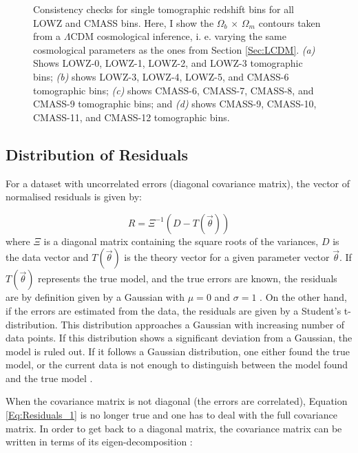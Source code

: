 \begin{figure}
\begin{subfigure}{.5\textwidth}
  \caption{}
\end{subfigure}%
\caption[Consistency checks for single tomographic redshift bins for all LOWZ and CMASS bins using the $\Omega_b\,  \times \, \Omega_{m}$ contours]{Consistency checks for single tomographic redshift bins for all LOWZ and CMASS bins. Here, I show the $\Omega_b\,  \times \, \Omega_{m}$ contours taken from a $\Lambda$CDM cosmological inference, i. e. varying the same cosmological parameters as the ones from Section \ref{Sec:LCDM}. \textit{(a)} Shows LOWZ-0, LOWZ-1, LOWZ-2, and LOWZ-3 tomographic bins; \textit{(b)} shows LOWZ-3, LOWZ-4, LOWZ-5, and CMASS-6 tomographic bins; \textit{(c)} shows CMASS-6, CMASS-7, CMASS-8, and CMASS-9 tomographic bins; and \textit{(d)} shows CMASS-9, CMASS-10, CMASS-11, and CMASS-12 tomographic bins.}
\label{fig:SiingleBinAnaly}
\end{figure}

\subsection{Distribution of Residuals}
For a dataset with uncorrelated errors (diagonal covariance matrix), the vector of normalised residuals is given by:

\begin{equation}
R = \Xi^{-1}(D - T(\vec{\theta}))
\label{Eq:Residuals_1}
\end{equation}
where $\Xi$ is a diagonal matrix containing the square roots of the variances, $D$ is the data vector and $T(\vec{\theta})$ is the theory vector for a given parameter vector $\vec{\theta}$. If $T(\vec{\theta})$ represents the true model, and the true errors are known, the residuals are by definition given by a Gaussian with $\mu=0$ and $\sigma=1$ \citep{chisq2010}. On the other hand, if the errors are estimated from the data, the residuals are given by a Student's t-distribution. This distribution approaches a Gaussian with increasing number of data points. If this distribution shows a significant deviation from a Gaussian, the model is ruled out. If it follows a Gaussian distribution, one either found the true model, or the current data is not enough to distinguish between the model found and the true model \citep{chisq2010}.

\qquad When the covariance matrix is not diagonal (the errors are correlated), Equation \eqref{Eq:Residuals_1} is no longer true and one has to deal with the full covariance matrix. In order to get back to a diagonal matrix, the covariance matrix can be written in terms of its eigen-decomposition :

